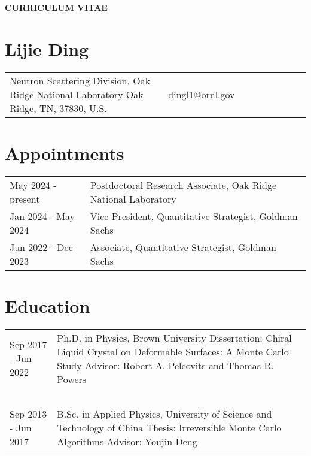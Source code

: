 \documentclass[11pt,letterpaper]{article}
\begin{document}
\pagestyle{headings}
\begin{center}
    \Large{\textbf{CURRICULUM VITAE}}
\end{center}
\section*{Lijie Ding}
\vspace*{-0.15in}
\begin{longtable}{p{0.5\linewidth} p{0.5\linewidth}}
    Neutron Scattering Division, \newline
    Oak Ridge National Laboratory \newline
    Oak Ridge, TN, 37830, U.S.
     & ~\newline
    dingl1@ornl.gov
\end{longtable}


\section*{Appointments}
\vspace*{-0.15in}
\begin{longtable}{l p{\linewidth}}
    May 2024 - present  & Postdoctoral Research Associate, Oak Ridge National Laboratory \\
    Jan 2024 - May 2024 & Vice President, Quantitative Strategist, Goldman Sachs \\
    Jun 2022 - Dec 2023 & Associate, Quantitative Strategist, Goldman Sachs \\
\end{longtable}


\section*{Education}
\vspace*{-0.15in}
\begin{longtable}{l p{\linewidth}}
    Sep 2017 - Jun 2022   & Ph.D. in Physics, Brown University \newline
    Dissertation: Chiral Liquid Crystal on Deformable Surfaces: A Monte Carlo Study \newline
    Advisor: Robert A. Pelcovits and Thomas R. Powers                                                 \\~\\
    Sep 2013 - Jun 2017   & B.Sc. in Applied Physics, University of Science and Technology of China \newline
    Thesis: Irreversible Monte Carlo Algorithms \newline
    Advisor: Youjin Deng
\end{longtable}
\end{document}
